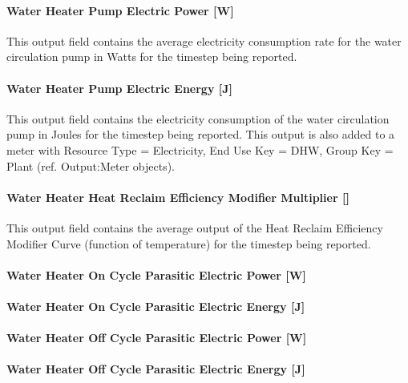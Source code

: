 \paragraph{Water Heater Pump Electric Power {[}W{]}}\label{water-heater-pump-electric-power-w}

This output field contains the average electricity consumption rate for the water circulation pump in Watts for the timestep being reported.

\paragraph{Water Heater Pump Electric Energy {[}J{]}}\label{water-heater-pump-electric-energy-j}

This output field contains the electricity consumption of the water circulation pump in Joules for the timestep being reported. This output is also added to a meter with Resource Type = Electricity, End Use Key = DHW, Group Key = Plant (ref. Output:Meter objects).

\paragraph{Water Heater Heat Reclaim Efficiency Modifier Multiplier {[]}}\label{water-heater-heat-reclaim-efficiency-modifier-multiplier}

This output field contains the average output of the Heat Reclaim Efficiency Modifier Curve (function of temperature) for the timestep being reported.

\paragraph{Water Heater On Cycle Parasitic Electric Power {[}W{]}}\label{water-heater-on-cycle-parasitic-electric-power-w}

\paragraph{Water Heater On Cycle Parasitic Electric Energy {[}J{]}}\label{water-heater-on-cycle-parasitic-electric-energy-j}

\paragraph{Water Heater Off Cycle Parasitic Electric Power {[}W{]}}\label{water-heater-off-cycle-parasitic-electric-power-w}

\paragraph{Water Heater Off Cycle Parasitic Electric Energy {[}J{]}}\label{water-heater-off-cycle-parasitic-electric-energy-j}

